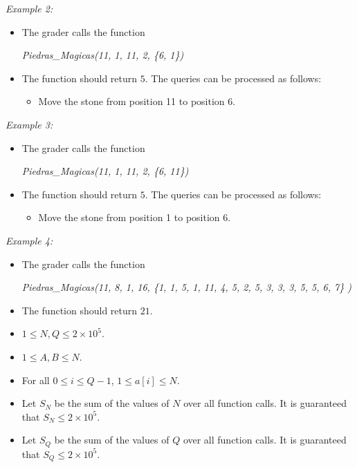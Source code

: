 \documentclass[12pt]{scrartcl}
\begin{document}
        {\itshape Example 2:}
        \begin{itemize}
            \item The grader calls the function 
            \begin{center}
                \textit{Piedras\_Magicas(11, 1, 11, 2, \{6, 1\})}
            \end{center}
            
            \item The function should return $5$. The queries can be processed as follows:
            \begin{itemize}
                \item Move the stone from position 11 to position 6.
            \end{itemize}
        \end{itemize}
        
        {\itshape Example 3:}
        \begin{itemize}
            \item The grader calls the function 
            \begin{center}
                \textit{Piedras\_Magicas(11, 1, 11, 2, \{6, 11\})}
            \end{center}
            
            \item The function should return $5$. The queries can be processed as follows:
            \begin{itemize}
                \item Move the stone from position 1 to position 6.
            \end{itemize}
        \end{itemize}
        
        {\itshape Example 4:}
        \begin{itemize}
            \item The grader calls the function 

            \begin{center}
            \textit{Piedras\_Magicas(11, 8, 1, 16, \{1, 1, 5, 1, 11, 4, 5, 2, 5, 3, 3, 3, 5, 5, 6, 7\} )}
            \end{center}
            
            \item The function should return $21$.
        \end{itemize}
        
        \begin{itemize}
            \item $1 \le N, Q \le 2\times 10^5$.
            \item $1 \le A, B \le N$.
            \item For all $0 \le i \le Q - 1$, $1 \le a[i] \le N$.
            \item Let $S_N$ be the sum of the values of $N$ over all function calls. It is guaranteed that $S_N \le 2\times10^5$.
            \item Let $S_Q$ be the sum of the values of $Q$ over all function calls. It is guaranteed that $S_Q \le 2\times10^5$.
        \end{itemize}
    
\end{document}
